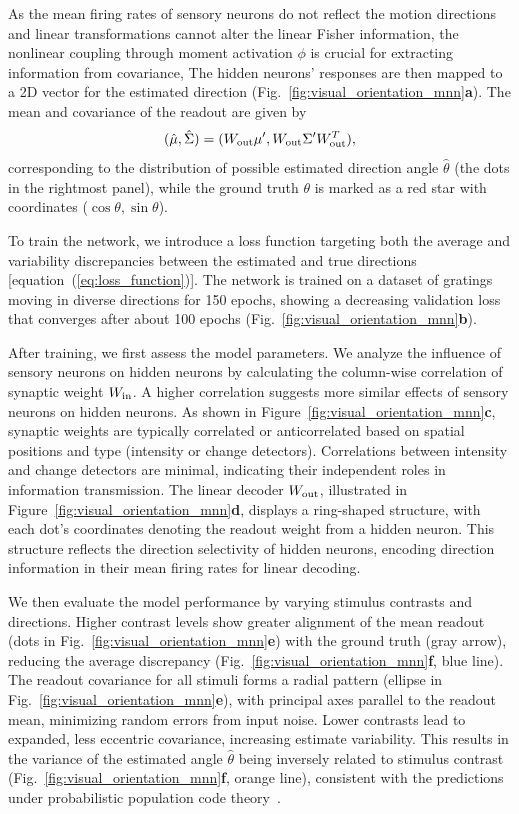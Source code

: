 As the mean firing rates of sensory neurons do not reflect the motion directions and linear transformations cannot alter the linear Fisher information, the nonlinear coupling through moment activation \(\phi\) is crucial for extracting information from covariance,
The hidden neurons' responses are then mapped to a 2D vector for the estimated direction (Fig.~\ref{fig:visual_orientation_mnn}\textbf{a}). 
The mean and covariance of the readout are given by
\begin{equation}
    (\hat{\mu}, \hat{\Sigma}) = (W_{\rm out}\mu', W_{\rm out}\Sigma' W_{\rm out}^T),
\end{equation}
corresponding to the distribution of possible estimated direction angle \(\hat \theta\) (the dots in the rightmost panel), while the ground truth \(\theta\) is marked as a red star with coordinates (\(\cos \theta, \sin \theta\)). 

To train the network, we introduce a loss function targeting both the average and variability discrepancies between the estimated and true directions [equation~(\ref{eq:loss_function})].
The network is trained on a dataset of gratings moving in diverse directions for 150 epochs, showing a decreasing validation loss that converges after about 100 epochs (Fig.~\ref{fig:visual_orientation_mnn}\textbf{b}).

After training, we first assess the model parameters. 
We analyze the influence of sensory neurons on hidden neurons by calculating the column-wise correlation of synaptic weight \(W_{\rm in}\). 
A higher correlation suggests more similar effects of sensory neurons on hidden neurons. 
As shown in Figure~\ref{fig:visual_orientation_mnn}\textbf{c}, synaptic weights are typically correlated or anticorrelated based on spatial positions and type (intensity or change detectors).
Correlations between intensity and change detectors are minimal, indicating their independent roles in information transmission. 
The linear decoder \(W_{\rm out}\), illustrated in Figure~\ref{fig:visual_orientation_mnn}\textbf{d}, displays a ring-shaped structure, with each dot's coordinates denoting the readout weight from a hidden neuron. 
This structure reflects the direction selectivity of hidden neurons, encoding direction information in their mean firing rates for linear decoding.
 
We then evaluate the model performance by varying stimulus contrasts and directions.
Higher contrast levels show greater alignment of the mean readout (dots in Fig.~\ref{fig:visual_orientation_mnn}\textbf{e}) with the ground truth (gray arrow), reducing the average discrepancy (Fig.~\ref{fig:visual_orientation_mnn}\textbf{f}, blue line). 
The readout covariance for all stimuli forms a radial pattern (ellipse in Fig.~\ref{fig:visual_orientation_mnn}\textbf{e}), with principal axes parallel to the readout mean, minimizing random errors from input noise.
Lower contrasts lead to expanded, less eccentric covariance, increasing estimate variability. 
This results in the variance of the estimated angle \(\hat\theta\) being inversely related to stimulus contrast (Fig.~\ref{fig:visual_orientation_mnn}\textbf{f}, orange line), consistent with the predictions under probabilistic population code theory~\cite{Ma2006}.

